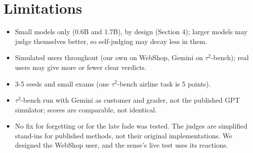 \section{Limitations}

\begin{itemize}
\tightlist
\item
  Small models only (0.6B and 1.7B), by design (Section 4); larger models may judge themselves better, so self-judging may decay less in them.
\item
  Simulated users throughout (our own on WebShop, Gemini on $\tau^2$-bench); real users may give more or fewer clear verdicts.
\item
  3-5 seeds and small exams (one $\tau^2$-bench airline task is 5 points).
\item
  $\tau^2$-bench run with Gemini as customer and grader, not the published GPT simulator; scores are comparable, not identical.
\item
  No fix for forgetting or for the late fade was tested. The judges are simplified stand-ins for published methods, not their original implementations. We designed the WebShop user, and the sense's live test uses its reactions.
\end{itemize}
